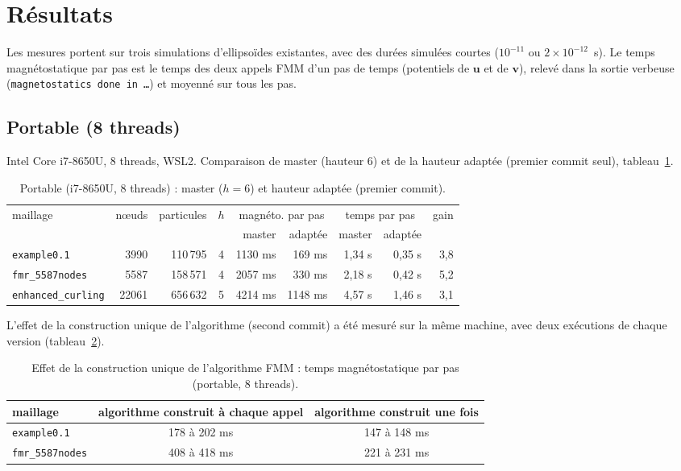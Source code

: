 \documentclass[11pt,a4paper]{article}
\newcommand{\code}[1]{\texttt{#1}}
\begin{document}
\section{Résultats}
\label{sec:results}

Les mesures portent sur trois simulations d'ellipsoïdes existantes, avec des durées simulées
courtes ($10^{-11}$ ou $2\times 10^{-12}$~s). Le \og temps magnétostatique par pas\fg{} est le
temps des deux appels FMM d'un pas de temps (potentiels de $\mathbf{u}$ et de $\mathbf{v}$), relevé
dans la sortie verbeuse (\code{magnetostatics done in \dots}) et moyenné sur tous les pas.

\subsection{Portable (8 threads)}

Intel Core i7-8650U, 8 threads, WSL2. Comparaison de master (hauteur 6) et de la hauteur
adaptée (premier commit seul), tableau~\ref{tab:laptop}.

\begin{table}[htbp]
\centering
\caption{Portable (i7-8650U, 8 threads) : master ($h = 6$) et hauteur adaptée (premier commit).}
\label{tab:laptop}
\begin{tabular}{lrrcrrrrr}
\toprule
maillage & nœuds & particules & $h$ & \multicolumn{2}{c}{magnéto. par pas} &
\multicolumn{2}{c}{temps par pas} & gain \\
\cmidrule(lr){5-6}\cmidrule(lr){7-8}
 & & & & master & adaptée & master & adaptée & \\
\midrule
\code{example0.1}        & 3990  & 110\,795 & 4 & 1130 ms & 169 ms  & 1,34 s & 0,35 s & 3,8 \\
\code{fmr\_5587nodes}    & 5587  & 158\,571 & 4 & 2057 ms & 330 ms  & 2,18 s & 0,42 s & 5,2 \\
\code{enhanced\_curling} & 22061 & 656\,632 & 5 & 4214 ms & 1148 ms & 4,57 s & 1,46 s & 3,1 \\
\bottomrule
\end{tabular}
\end{table}

L'effet de la construction unique de l'algorithme (second commit) a été mesuré sur la même
machine, avec deux exécutions de chaque version (tableau~\ref{tab:algo}).
\begin{table}[htbp]
\centering
\caption{Effet de la construction unique de l'algorithme FMM : temps magnétostatique par pas (portable, 8 threads).}
\label{tab:algo}
\begin{tabular}{lcc}
\toprule
maillage & algorithme construit à chaque appel & algorithme construit une fois \\
\midrule
\code{example0.1}     & 178 à 202 ms & 147 à 148 ms \\
\code{fmr\_5587nodes} & 408 à 418 ms & 221 à 231 ms \\
\bottomrule
\end{tabular}
\end{table}
\end{document}

